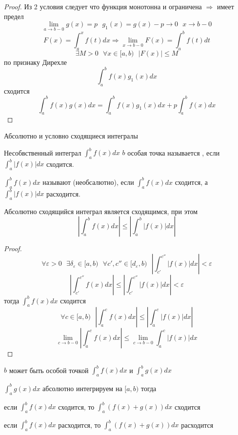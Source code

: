 \begin{proof}
  Из 2 условия следует что функция монотонна и ограничена $\Rightarrow$ имеет
  предел
  $$
  \lim_{a \to b-0}g(x) = p ~~~ g_1(x) = g(x) - p \to 0 ~~~ x \to b-0
  $$
  $$
  F(x) = \int_a^x f(t)dx \Rightarrow \lim_{x \to b-0} F(x) = \int_a^b f(t)dt
  $$
  $$
  \exists M > 0 ~~~ \forall x \in [a,b) ~~~ |F(x)| \le M
  $$
  по признаку Дирехле
  $$
  \int_a^b f(x)g_1(x)dx
  $$
  сходится
  $$
  \int_a^b f(x)g(x)dx = \int_a^b f(x)g_1(x)dx + p\int_a^b f(x)dx
  $$
\end{proof}

\begin{title}[\Large]
  Абсолютно и условно сходящиеся интегралы
\end{title}

\begin{defin}
  Несобвственный интеграл $\int_a^b f(x)dx$ $b$ особая точка называется
  , если $\int_a^b |f(x)|dx$ сходится.
\end{defin}

\begin{defin}
  $\int_a^b f(x)dx$ называют  (необсалютно), если
  $\int_a^b f(x)dx$ сходится, а $\int_a^b |f(x)|dx$ расходится.
\end{defin}

\begin{theorem}
  Абсолютно сходящийся интеграл является сходящимся, при этом
  $$
  \left| \int_a^b f(x)dx \right| \le \left| \int_a^b |f(x)|dx \right|
  $$
\end{theorem}

\begin{proof}
  $$
  \forall \varepsilon > 0 ~~~ \exists \delta_{\varepsilon} \in [a,b) ~~~
  \forall c',c'' \in [d_{\varepsilon}, b) ~~~
  \left| \int_{c'}^{c''} |f(x)|dx \right| < \varepsilon
  $$
  $$
  \left| \int_{c'}^{c''} f(x)dx \right| \le
  \left| \int_{c'}^{c''} |f(x)|dx \right| < \varepsilon
  $$
  тогда $\int_a^b f(x) dx$ сходится
  $$
  \forall c \in [a,b) ~~~ \left| \int_a^c f(x)dx \right| \le
  \left| \int_a^c |f(x)|dx \right|
  $$
  $$
  \lim_{c \to b-0} \left| \int_a^{c} f(x)dx \right| \le
  \lim_{c \to b-0} \int_a^c |f(x)|dx
  $$
\end{proof}

\begin{theorem}
  $b$ может быть особой точкой $\int_a^b f(x)dx$ и $\int_a^b g(x)dx$

$\int_a^b g(x)dx$ абсолютно интегрируем на $[a,b)$ тогда

  если $\int_a^b f(x)dx$ сходится, то $\int_a^b (f(x) + g(x)) dx$ сходится

  если $\int_a^b f(x)dx$ расходится, то $\int_a^b (f(x) + g(x)) dx$ расходится
\end{theorem}


